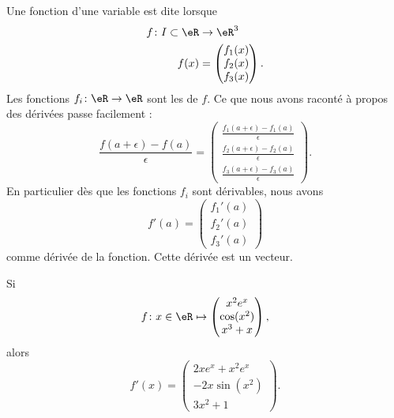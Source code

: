 Une fonction d'une variable est dite  lorsque
\begin{equation}
	\begin{aligned}
		f\colon I\subset \eR & \to \eR^3                     \\
		f(x)                 & =\begin{pmatrix}
			f_1(x) \\
			f_2(x) \\
			f_3(x)
		\end{pmatrix}.
	\end{aligned}
\end{equation}
Les fonctions \( f_i\colon \eR\to \eR\) sont les  de \( f\). Ce que nous avons raconté à propos des dérivées passe facilement :
\begin{equation}
	\frac{ f(a+\epsilon)-f(a) }{ \epsilon }=
	\begin{pmatrix}
		\frac{ f_1(a+\epsilon)-f_1(a) }{ \epsilon } \\
		\frac{ f_2(a+\epsilon)-f_2(a) }{ \epsilon } \\
		\frac{ f_3(a+\epsilon)-f_3(a) }{ \epsilon }
	\end{pmatrix}.
\end{equation}
En particulier dès que les fonctions \( f_i\) sont dérivables, nous avons
\begin{equation}
	f'(a)=\begin{pmatrix}
		f_1'(a) \\
		f_2'(a) \\
		f_3'(a)
	\end{pmatrix}
\end{equation}
comme dérivée de la fonction. Cette dérivée est un vecteur.

\begin{example}
	Si
	\begin{equation}
		f\colon x\in\eR\mapsto \begin{pmatrix}
			x^2 e^{x} \\
			\cos(x^2) \\
			x^3+x
		\end{pmatrix},
	\end{equation}
	alors
	\begin{equation}
		f'(x)=\begin{pmatrix}
			2xe^x+x^2e^x \\
			-2x\sin(x^2) \\
			3x^2+1
		\end{pmatrix}.
	\end{equation}
\end{example}

